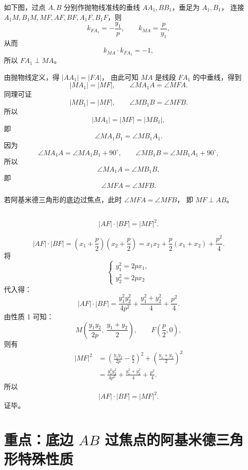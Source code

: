 \documentclass[UTF8]{ctexart}
\begin{document}
	\textbf{\color{red}{证明：}}
	如下图，过点 $A,B$ 分别作抛物线准线的垂线 $AA_1,BB_1$，垂足为 $A_1,B_1$，
	连接 $A_1M,B_1M,MF,AF,BF,A_1F,B_1F$，则
	\[
	k_{FA_1}=-\frac{y_1}{p},\qquad k_{MA}=\frac{p}{y_1},
	\]
	从而
	\[
	k_{MA}\cdot k_{FA_1}=-1,
	\]
	所以 $FA_1\perp MA$。
	
	由抛物线定义，得 $|AA_1|=|FA|$，
	由此可知 $MA$ 是线段 $FA_1$ 的中垂线，得到
	\[
	|MA_1|=|MF|,\qquad \angle MA_1A=\angle MFA.
	\]
	同理可证
	\[
	|MB_1|=|MF|,\qquad \angle MB_1B=\angle MFB.
	\]
	所以
	\[
	|MA_1|=|MF|=|MB_1|,
	\]
	即
	\[
	\angle MA_1B_1=\angle MB_1A_1.
	\]
	因为
	\[
	\angle MA_1A=\angle MA_1B_1+90^\circ,\qquad
	\angle MB_1B=\angle MB_1A_1+90^\circ,
	\]
	所以
	\[
	\angle MA_1A=\angle MB_1B,
	\]
	即
	\[
	\angle MFA=\angle MFB.
	\]
	
	\textbf{\color{red}{特别的：}}
	若阿基米德三角形的底边过焦点，此时 $\angle MFA=\angle MFB$，
	即 $MF\perp AB$。
	
	\subsection*{\color{green!60!black}{性质 4}}
	\[
	|AF|\cdot|BF|=|MF|^2.
	\]
	
	\textbf{\color{red}{证明：}}
	\[
	|AF|\cdot|BF|
	=\left(x_1+\frac p2\right)\left(x_2+\frac p2\right)
	=x_1x_2+\frac p2(x_1+x_2)+\frac{p^2}{4}.
	\]
	将
	\[
	\begin{cases}
		y_1^2=2px_1,\\
		y_2^2=2px_2
	\end{cases}
	\]
	代入得：
	\[
	|AF|\cdot|BF|
	=\frac{y_1^2y_2^2}{4p^2}+\frac{y_1^2+y_2^2}{4}+\frac{p^2}{4}.
	\]
	由性质 1 可知：
	\[
	M\!\left(\frac{y_1y_2}{2p},\ \frac{y_1+y_2}{2}\right),\qquad
	F\!\left(\frac p2,0\right),
	\]
	则有
	\begin{align*}
		|MF|^2
		&=\left(\frac{y_1y_2}{2p}-\frac p2\right)^2+\left(\frac{y_1+y_2}{2}\right)^2\\
		&=\frac{y_1^2y_2^2}{4p^2}+\frac{y_1^2+y_2^2}{4}+\frac{p^2}{4}.
	\end{align*}
	所以
	\[
	|AF|\cdot|BF|=|MF|^2.
	\]
	证毕。
	
	
	
	\section*{重点：底边 $AB$ 过焦点的阿基米德三角形特殊性质}
	
\end{document}
